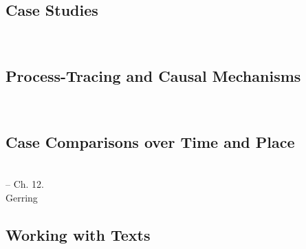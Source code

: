 \documentclass[12pt,a4paper]{article}
\newcommand{\lecture}[3][\DefaultOpt]{%
  \def\DefaultOpt{#2}%
  \clearpage\subsection[#1]{#2}\emph{#3}\vspace{.25em}\\
}
\newcommand{\textbook}[2][]{\noindent -- {#1}#2.\vspace{.25em}\\}
\begin{document}
\lecture{Case Studies}{}

\lecture{Process-Tracing and Causal Mechanisms}{}

\lecture{Case Comparisons over Time and Place}{}
\textbook{Ch. 12}{Gerring}


\lecture{Working with Texts}{}
\end{document}
